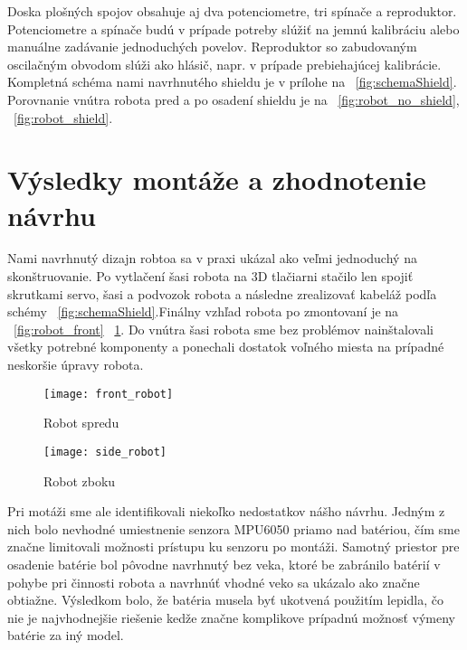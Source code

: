 Doska plošných spojov obsahuje aj dva potenciometre, tri spínače a reproduktor. Potenciometre a spínače budú v prípade potreby slúžiť na jemnú kalibráciu alebo manuálne zadávanie jednoduchých povelov. Reproduktor so zabudovaným oscilačným obvodom slúži ako hlásič, napr. v prípade prebiehajúcej kalibrácie. Kompletná schéma nami navrhnutého shieldu je v prílohe na \figurename~\ref{fig:schemaShield}. Porovnanie vnútra robota pred a po osadení shieldu je na \figurename~\ref{fig:robot_no_shield}, \figurename~\ref{fig:robot_shield}.

\section{Výsledky montáže a zhodnotenie návrhu}
Nami navrhnutý dizajn robtoa sa v praxi ukázal ako veľmi jednoduchý na skonštruovanie. Po vytlačení šasi robota na 3D tlačiarni stačilo len spojiť skrutkami servo, šasi a podvozok robota a následne zrealizovať kabeláž podľa schémy \figurename~\ref{fig:schemaShield}.Finálny vzhľad robota po zmontovaní je na \figurename~\ref{fig:robot_front} \figurename~\ref{fig:robot_side}. Do vnútra šasi robota sme bez problémov nainštalovali všetky potrebné komponenty a ponechali dostatok voľného miesta na prípadné neskoršie úpravy robota.   

\begin{figure}[h]
\centering
\begin{minipage}[b]{0.48\textwidth}
\centering
\texttt{[image: front\_robot]}
\caption{Robot spredu}
\label{fig:robot_front}
\end{minipage}\quad
\begin{minipage}[b]{0.48\textwidth}
\centering
\texttt{[image: side\_robot]}
\caption{Robot zboku}
\label{fig:robot_side}
\end{minipage}
\end{figure}


Pri motáži sme ale identifikovali niekoľko nedostatkov nášho návrhu. Jedným z nich bolo nevhodné umiestnenie senzora MPU6050 priamo nad batériou, čím sme značne limitovali možnosti prístupu ku senzoru po montáži. Samotný priestor pre osadenie batérie bol pôvodne navrhnutý bez veka, ktoré be zabránilo batérií v pohybe pri činnosti robota a navrhnúť vhodné veko sa ukázalo ako značne obtiažne. Výsledkom bolo, že batéria musela byť ukotvená použitím lepidla, čo nie je najvhodnejšie riešenie kedže značne komplikove prípadnú možnosť výmeny batérie za iný model.    

